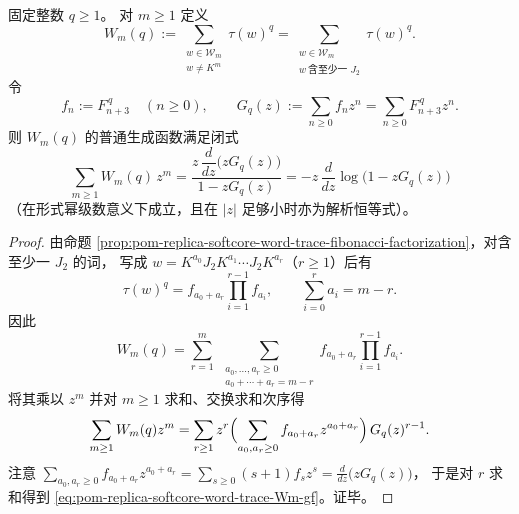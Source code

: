 \begin{theorem}[整数底数簇的循环生成函数闭式]\label{thm:pom-replica-softcore-word-trace-cycle-gf}
固定整数 \(q\ge 1\)。
对 \(m\ge 1\) 定义
\[
W_m(q):=\sum_{\substack{w\in\mathcal{W}_m\\ w\neq K^m}}\tau(w)^q
=\sum_{\substack{w\in\mathcal{W}_m\\ w\ \text{含至少一 }J_2}}\tau(w)^q.
\]
令
\[
f_n:=F_{n+3}^{\,q}\quad(n\ge 0),
\qquad
G_q(z):=\sum_{n\ge 0}f_n z^n=\sum_{n\ge 0}F_{n+3}^{\,q}z^n.
\]
则 \(W_m(q)\) 的普通生成函数满足闭式
\begin{equation}\label{eq:pom-replica-softcore-word-trace-Wm-gf}
\boxed{\;
\sum_{m\ge 1}W_m(q)\,z^m
=\frac{z\,\dfrac{d}{dz}\bigl(zG_q(z)\bigr)}{1-zG_q(z)}
=-z\,\frac{d}{dz}\log\bigl(1-zG_q(z)\bigr)\;}
\end{equation}
（在形式幂级数意义下成立，且在 \(|z|\) 足够小时亦为解析恒等式）。
\end{theorem}
\begin{proof}
由命题 \ref{prop:pom-replica-softcore-word-trace-fibonacci-factorization}，对含至少一 \(J_2\) 的词，
写成 \(w=K^{a_0}J_2K^{a_1}\cdots J_2K^{a_r}\)（\(r\ge 1\)）后有
\[
\tau(w)^q
=f_{a_0+a_r}\prod_{i=1}^{r-1}f_{a_i},
\qquad
\sum_{i=0}^{r}a_i=m-r.
\]
因此
\[
W_m(q)
=\sum_{r=1}^{m}\ \sum_{\substack{a_0,\dots,a_r\ge 0\\ a_0+\cdots+a_r=m-r}}
f_{a_0+a_r}\prod_{i=1}^{r-1}f_{a_i}.
\]
将其乘以 \(z^m\) 并对 \(m\ge 1\) 求和、交换求和次序得
\[
\sum_{m\ge 1}W_m(q)z^m
=\sum_{r\ge 1}z^r\Bigl(\sum_{a_0,a_r\ge 0} f_{a_0+a_r}z^{a_0+a_r}\Bigr)\,G_q(z)^{r-1}.
\]
注意
\(
\sum_{a_0,a_r\ge 0} f_{a_0+a_r}z^{a_0+a_r}
=\sum_{s\ge 0}(s+1)f_s z^s
=\frac{d}{dz}\bigl(zG_q(z)\bigr)
\)，
于是对 \(r\) 求和得到 \eqref{eq:pom-replica-softcore-word-trace-Wm-gf}。证毕。
\end{proof}

